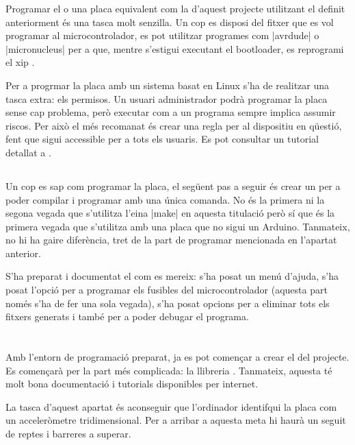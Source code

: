 Programar el  o una placa equivalent com la d'aquest projecte
utilitzant el  definit anteriorment és una tasca molt senzilla.
Un cop es disposi del fitxer  que es vol programar al
microcontrolador, es pot utilitzar programes com \ord|avrdude| o
\est|micronucleus| per a que, mentre s'estigui executant el bootloader, es 
reprogrami el xip \cite{DigisparkBootloader}.

Per a progrmar la placa amb un sistema basat en Linux s'ha de realitzar una
tasca extra: els permisos. Un usuari administrador podrà programar la placa
sense cap problema, però executar com a  un programa sempre implica
assumir riscos. Per això el més recomanat és crear una regla 
per al dispositiu en qüestió, fent que sigui accessible per a tots els usuaris.
Es pot consultar un tutorial detallat a \cite{CreateUdevRules}.

\subsection{}

Un cop es sap com programar la placa, el següent pas a seguir és crear un
 per a poder compilar i programar amb una única comanda.
No és la primera ni la segona vegada que s'utilitza l'eina \ord|make| en
aquesta titulació però sí que és la primera vegada que s'utilitza amb una placa
que no sigui un Arduino. Tanmateix, no hi ha gaire diferència, tret de la
part de programar mencionada en l'apartat anterior.

S'ha preparat i documentat el  com es mereix: s'ha posat un menú
d'ajuda, s'ha posat l'opció per a programar els fusibles del microcontrolador
(aquesta part només s'ha de fer una sola vegada), s'ha posat opcions per a
eliminar tots els fitxers generats i també per a poder debugar el programa.

\section{}

Amb l'entorn de programació preparat, ja es pot començar a crear el
 del projecte. Es començarà per la part més complicada: la
llibreria . Tanmateix, aquesta té molt bona documentació i
tutorials disponibles per internet.

La tasca d'aquest apartat és aconseguir que l'ordinador identifqui la placa
com un acceleròmetre tridimensional. Per a arribar a aquesta meta hi haurà un
seguit de reptes i barreres a superar.

